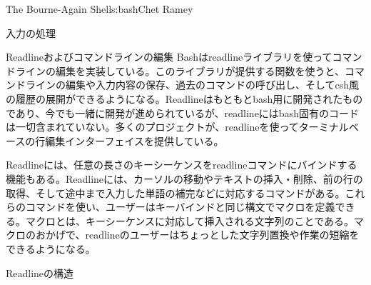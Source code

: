 \begin{aosachapter}{The Bourne-Again Shell}{s:bash}{Chet Ramey}
\begin{aosasect1}{入力の処理}
\begin{aosasect2}{Readlineおよびコマンドラインの編集}
Bashはreadlineライブラリを使ってコマンドラインの編集を実装している。このライブラリが提供する関数を使うと、コマンドラインの編集や入力内容の保存、過去のコマンドの呼び出し、そしてcsh風の履歴の展開ができるようになる。Readlineはもともとbash用に開発されたものであり、今でも一緒に開発が進められているが、readlineにはbash固有のコードは一切含まれていない。多くのプロジェクトが、readlineを使ってターミナルベースの行編集インターフェイスを提供している。

Readlineには、任意の長さのキーシーケンスをreadlineコマンドにバインドする機能もある。Readlineには、カーソルの移動やテキストの挿入・削除、前の行の取得、そして途中まで入力した単語の補完などに対応するコマンドがある。これらのコマンドを使い、ユーザーはキーバインドと同じ構文でマクロを定義できる。マクロとは、キーシーケンスに対応して挿入される文字列のことである。マクロのおかげで、readlineのユーザーはちょっとした文字列置換や作業の短縮をできるようになる。

\begin{aosasect3}{Readlineの構造}


\end{aosasect3}
\end{aosasect2}
\end{aosasect1}
\end{aosachapter}

